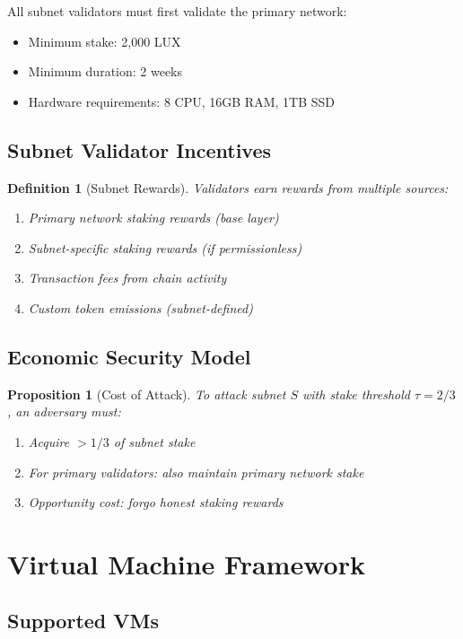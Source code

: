 \documentclass[11pt,a4paper]{article}
\newtheorem{proposition}[theorem]{Proposition}
\newtheorem{definition}{Definition}
\begin{document}
All subnet validators must first validate the primary network:

\begin{itemize}
    \item Minimum stake: 2,000 LUX
    \item Minimum duration: 2 weeks
    \item Hardware requirements: 8 CPU, 16GB RAM, 1TB SSD
\end{itemize}

\subsection{Subnet Validator Incentives}

\begin{definition}[Subnet Rewards]
Validators earn rewards from multiple sources:
\begin{enumerate}
    \item Primary network staking rewards (base layer)
    \item Subnet-specific staking rewards (if permissionless)
    \item Transaction fees from chain activity
    \item Custom token emissions (subnet-defined)
\end{enumerate}
\end{definition}

\subsection{Economic Security Model}

\begin{proposition}[Cost of Attack]
To attack subnet $S$ with stake threshold $\tau = 2/3$, an adversary must:
\begin{enumerate}
    \item Acquire $> 1/3$ of subnet stake
    \item For primary validators: also maintain primary network stake
    \item Opportunity cost: forgo honest staking rewards
\end{enumerate}
\end{proposition}

\section{Virtual Machine Framework}

\subsection{Supported VMs}
\end{document}
